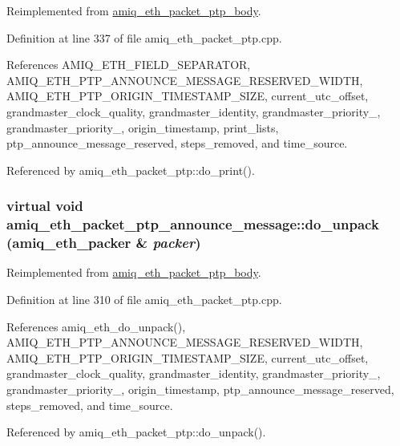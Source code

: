 Reimplemented from \hyperlink{classamiq__eth__packet__ptp__body_a44ff8df4c84f236f8bab792ceb338e6a}{amiq\_\-eth\_\-packet\_\-ptp\_\-body}.

Definition at line 337 of file amiq\_\-eth\_\-packet\_\-ptp.cpp.

References AMIQ\_\-ETH\_\-FIELD\_\-SEPARATOR, AMIQ\_\-ETH\_\-PTP\_\-ANNOUNCE\_\-MESSAGE\_\-RESERVED\_\-WIDTH, AMIQ\_\-ETH\_\-PTP\_\-ORIGIN\_\-TIMESTAMP\_\-SIZE, current\_\-utc\_\-offset, grandmaster\_\-clock\_\-quality, grandmaster\_\-identity, grandmaster\_\-priority\_, grandmaster\_\-priority\_, origin\_\-timestamp, print\_\-lists, ptp\_\-announce\_\-message\_\-reserved, steps\_\-removed, and time\_\-source.

Referenced by amiq\_\-eth\_\-packet\_\-ptp::do\_\-print().\hypertarget{classamiq__eth__packet__ptp__announce__message_ad5f6e496679c3ba130275b5330a23366}{
\subsubsection[{do\_\-unpack}]{\setlength{\rightskip}{0pt plus 5cm}virtual void amiq\_\-eth\_\-packet\_\-ptp\_\-announce\_\-message::do\_\-unpack ({\bf amiq\_\-eth\_\-packer} \& {\em packer})}}
\label{classamiq__eth__packet__ptp__announce__message_ad5f6e496679c3ba130275b5330a23366}


Reimplemented from \hyperlink{classamiq__eth__packet__ptp__body_a17a10ad537b6553f35b54d2f037d4f0d}{amiq\_\-eth\_\-packet\_\-ptp\_\-body}.

Definition at line 310 of file amiq\_\-eth\_\-packet\_\-ptp.cpp.

References amiq\_\-eth\_\-do\_\-unpack(), AMIQ\_\-ETH\_\-PTP\_\-ANNOUNCE\_\-MESSAGE\_\-RESERVED\_\-WIDTH, AMIQ\_\-ETH\_\-PTP\_\-ORIGIN\_\-TIMESTAMP\_\-SIZE, current\_\-utc\_\-offset, grandmaster\_\-clock\_\-quality, grandmaster\_\-identity, grandmaster\_\-priority\_, grandmaster\_\-priority\_, origin\_\-timestamp, ptp\_\-announce\_\-message\_\-reserved, steps\_\-removed, and time\_\-source.

Referenced by amiq\_\-eth\_\-packet\_\-ptp::do\_\-unpack().

